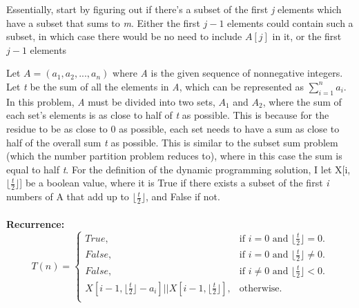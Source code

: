 \documentclass[11pt]{article}
\newcommand\floor[1]{\lfloor#1\rfloor}
\begin{document}
Essentially, start by figuring out if there’s a subset of the first \textit{j} elements which have a subset that sums to \textit{m}. Either the first $j − 1$ elements could contain such a subset, in which case there would be no need to include $A[j]$ in it, or the first $j − 1$ elements




Let $\textit{A} = (a_1, a_2, ..., a_n)$ where \textit{A} is the given sequence of nonnegative integers. Let \textit{t} be the sum of all
the elements in \textit{A}, which can be represented as  $ \sum_{i=1}^{n} a_{i} $. In this problem, \textit{A} must be divided into two sets, $\textit{A}_1$ and $\textit{A}_2$, where the sum of each set’s elements is as close to half of \textit{t} as possible. This is because for the residue to be as close to 0 as possible, each set needs to have a sum as close to half of the overall sum \textit{t} as possible. This is similar to the subset sum problem (which the number partition problem reduces to), where in this case the sum is equal to half \textit{t}. For the definition of the dynamic programming solution, I let X[i, $\floor{\frac{\textit{t}}{2}}$] be a boolean value, where it is True if there exists a subset of the first \textit{i} numbers of A that add up to $ \floor{\frac{\textit{t}}{2}} $, and False if not. \\\\

\textbf{Recurrence:}\\
\begin{equation}
	T(n) = \begin{cases}
		True, & \text{if $i = 0$ and $\floor{\frac{\textit{t}}{2}} = 0$}. \\
		False, &\text{if $i = 0$ and $\floor{\frac{\textit{t}}{2}} \neq 0$}. \\
		False, &\text{if $i \neq 0$ and $\floor{\frac{\textit{t}}{2}} < 0$}. \\
		X[i - 1, \floor{\frac{\textit{t}}{2}} - a_i] || X[i - 1, \floor{\frac{\textit{t}}{2}}], & \text{otherwise}. \\
	\end{cases}
\end{equation}
\end{document}
